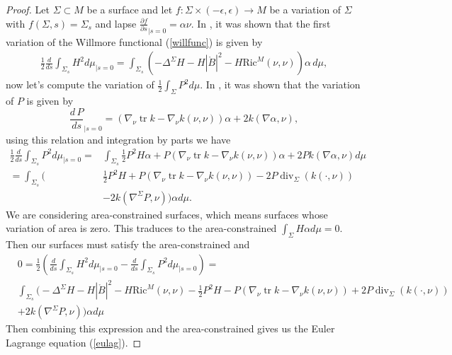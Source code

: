 \documentclass[12pt,a4paper]{amsart}
\theoremstyle{plain}
\theoremstyle{definition}
\newcommand{\diver}{\operatorname{div}}
\newcommand{\tr}{\operatorname{tr}}
\begin{document}
\begin{proof}
Let $\Sigma \subset M$ be a surface and let $f: \Sigma \times (-\epsilon , \epsilon) \rightarrow M$ be a variation of $\Sigma$ with $f(\Sigma, s)= \Sigma_s$ and lapse $\frac{\partial f}{\partial s }_{|s=0}=\alpha \nu $. In \cite[Section 3]{willflat}, it was shown that the first variation of the Willmore functional (\ref{willfunc}) is given by 
\begin{equation}
\begin{split}
  \frac{1}{2}  \frac{d}{d s}\int_{\Sigma_s} H^2  d\mu_{| s=0}  = \int_{\Sigma_s} \left( -\Delta^\Sigma  H - H|\mathring{B}|^2- H\mathrm{Ric}^M(\nu, \nu)  \right) \alpha \, d\mu,
    \end{split}
\end{equation}
now let's compute the variation of $\frac{1}{2} \int_\Sigma P^2  d\mu $. In \cite{Ce}, it was shown that the variation of $P$ is given by
\begin{equation}
    \frac{d\, P }{d s}_{| s=0}=\left( \nabla_\nu \tr k - \nabla_\nu k(\nu, \nu)\right)\alpha +2 k(\nabla \alpha, \nu),
\end{equation}
using this relation and integration by parts we have 
\begin{equation}
\begin{split}
 \frac{1}{2}  \frac{d}{d s}\int_{\Sigma_s} P^2  d\mu_{| s=0}  =& \int_{\Sigma_s} \frac{1}{2} P^2 H  \alpha +P\left( \nabla_\nu \tr k - \nabla_\nu k(\nu, \nu)\right)\alpha +2P k(\nabla \alpha, \nu)  d\mu\\
 =\int_{\Sigma_s}\big( &\frac{1}{2} P^2 H   +P\left( \nabla_\nu \tr k - \nabla_\nu k(\nu, \nu)\right) -2P \diver_\Sigma \left( k(\cdot, \nu) \right )\\
 &- 2 k(\nabla^\Sigma P, \nu ) \big) \alpha  d\mu.
    \end{split}
\end{equation}
We are considering area-constrained surfaces, which means surfaces whose variation of area is zero. This traduces to the area-constrained $\int_\Sigma H \alpha d\mu =0 $. Then our surfaces must satisfy the area-constrained and 
\begin{equation*}
\begin{split}
 &0=\frac{1}{2}  \left( \frac{d}{d s}\int_{\Sigma_s} H^2  d\mu_{|s=0} -  \frac{d}{d s}\int_{\Sigma_s} P^2  d\mu_{|s=0} \right)  =\\
 &\int_{\Sigma_s} \big( -\Delta^\Sigma H - H|\mathring{B}|^2- H \mathrm{Ric}^M(\nu, \nu) - \frac{1}{2} P^2 H   -P\left( \nabla_\nu \tr k - \nabla_\nu k(\nu, \nu)\right) +2P \diver_\Sigma \left( k(\cdot, \nu) \right )\\
 &+ 2 k(\nabla^\Sigma P, \nu ) \big) \alpha  d\mu
    \end{split}
\end{equation*}
 Then combining  this expression and the area-constrained gives us the Euler Lagrange equation (\ref{eulag}).
\end{proof}
\end{document}
